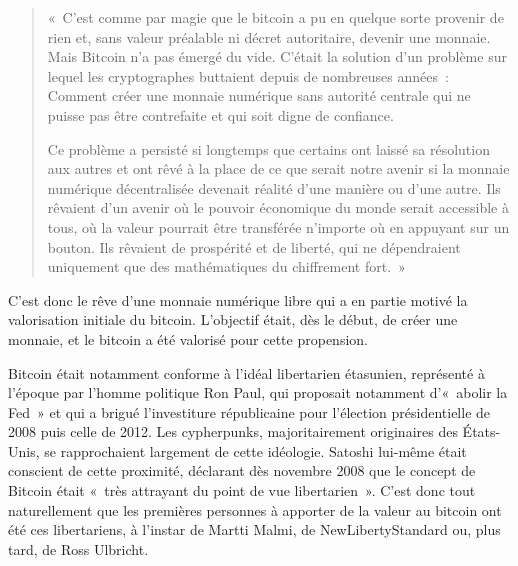 \begin{quote}
«~C'est comme par magie que le bitcoin a pu en quelque sorte provenir de rien et, sans valeur préalable ni décret autoritaire, devenir une monnaie. Mais Bitcoin n'a pas émergé du vide. C'était la solution d'un problème sur lequel les cryptographes buttaient depuis de nombreuses années~: Comment créer une monnaie numérique sans autorité centrale qui ne puisse pas être contrefaite et qui soit digne de confiance.

Ce problème a persisté si longtemps que certains ont laissé sa résolution aux autres et ont rêvé à la place de ce que serait notre avenir si la monnaie numérique décentralisée devenait réalité d'une manière ou d'une autre. Ils rêvaient d'un avenir où le pouvoir économique du monde serait accessible à tous, où la valeur pourrait être transférée n'importe où en appuyant sur un bouton. Ils rêvaient de prospérité et de liberté, qui ne dépendraient uniquement que des mathématiques du chiffrement fort.~»
\end{quote}

C'est donc le rêve d'une monnaie numérique libre qui a en partie motivé la valorisation initiale du bitcoin. L'objectif était, dès le début, de créer une monnaie, et le bitcoin a été valorisé pour cette propension. 

Bitcoin était notamment conforme à l'idéal libertarien étasunien, représenté à l'époque par l'homme politique Ron Paul, qui proposait notamment d'«~abolir la Fed~» et qui a brigué l'investiture républicaine pour l'élection présidentielle de 2008 puis celle de 2012. Les cypherpunks, majoritairement originaires des États-Unis, se rapprochaient largement de cette idéologie. Satoshi lui-même était conscient de cette proximité, déclarant dès novembre 2008 que le concept de Bitcoin était «~très attrayant du point de vue libertarien~». C'est donc tout naturellement que les premières personnes à apporter de la valeur au bitcoin ont été ces libertariens, à l'instar de Martti Malmi, de NewLibertyStandard ou, plus tard, de Ross Ulbricht.



